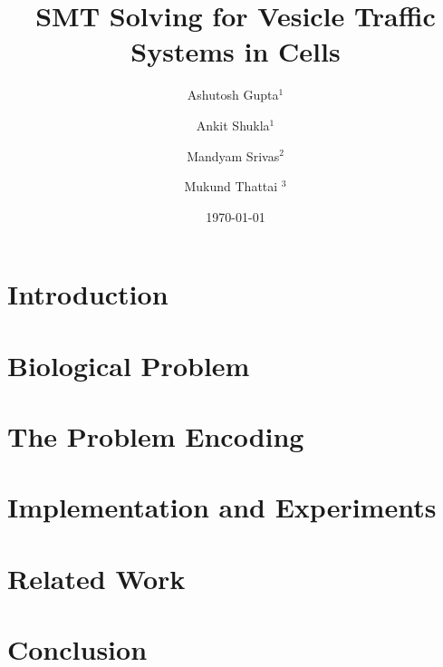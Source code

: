\documentclass{llncs}
\begin{document}
\title{SMT Solving for Vesicle Traffic Systems in Cells}

\author{Ashutosh Gupta$^1$ \and Ankit Shukla$^1$ \and
  Mandyam Srivas$^2$ \and Mukund Thattai $^3$}


\date{\today}

\maketitle

\begin{abstract}

\end{abstract}

\section{Introduction}
\label{sec:intro}
% 


\section{Biological Problem}
\label{sec:bio}
% 


\section{The Problem Encoding}
\label{sec:encoding}


\section{Implementation and Experiments}
\label{sec:experiments}


\section{Related Work}
\label{sec:related}


\section{Conclusion}
\label{sec:conclusion}




\end{document}
